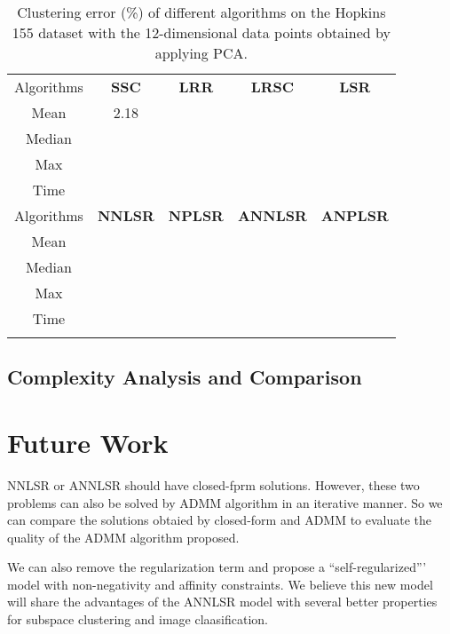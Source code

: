 \documentclass[10pt,twocolumn,letterpaper]{article}
\renewcommand{\huge}{\fontsize{8.6pt}{\baselineskip}\selectfont}
\begin{document}
\begin{table}[hbp]
\caption{Clustering error (\%) of different algorithms on the Hopkins 155 dataset \cite{hopkins} with the 12-dimensional data points obtained by applying PCA.}
\label{t3}
\vspace{-4mm}
\begin{center}
\renewcommand\arraystretch{1}
\scriptsize
\begin{tabular}{ccccc}
\Xhline{0.5pt}
Algorithms
&
\textbf{SSC}\cite{ssc}
&
\textbf{LRR}\cite{lrr}
&
\textbf{LRSC}\cite{lrsc}
&
\textbf{LSR}\cite{lsr}
\\
\Xhline{1.2pt}
Mean & 2.18 &  &  &  
\\
\Xhline{0.5pt}
Median &  &  &  &  
\\
\Xhline{0.5pt}
Max &  &  &  &  
\\
\Xhline{0.5pt}
Time &  &  &  &  
\\
\Xhline{0.5pt}
Algorithms
&
\textbf{NNLSR}
&
\textbf{NPLSR}
&
\textbf{ANNLSR}
&
\textbf{ANPLSR}
\\
\Xhline{1.2pt}
Mean &  &  &  &  
\\
\Xhline{0.5pt}
Median &  &  &  &  
\\
\Xhline{0.5pt}
Max &  &  &  &  
\\
\Xhline{0.5pt}
Time &  &  &  &  
\\
\Xhline{0.5pt} 
\end{tabular}
\end{center}
\vspace{-3mm}
\end{table}


\subsection{Complexity Analysis and Comparison}


\section{Future Work}
NNLSR or ANNLSR should have closed-fprm solutions. However, these  two problems can also be solved by ADMM algorithm in an iterative manner. So we can compare the solutions obtaied by  closed-form and ADMM to evaluate the quality of the ADMM algorithm proposed.

We can also remove the regularization term and propose a ``self-regularized''' model with non-negativity and affinity constraints. We believe this new model will share the advantages of the ANNLSR model with several better properties for subspace clustering and image claasification.

{
\small


}
\end{document}
